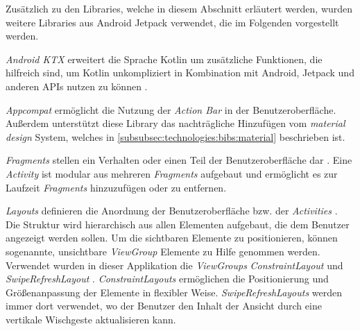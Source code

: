 \documentclass[a4paper]{article}
\begin{document}
Zusätzlich zu den Libraries, welche in diesem Abschnitt erläutert werden, wurden weitere Libraries aus Android Jetpack verwendet, die im Folgenden vorgestellt werden.

\textit{Android KTX} erweitert die Sprache Kotlin um zusätzliche Funktionen, die hilfreich sind, um Kotlin unkompliziert in Kombination mit Android, Jetpack und anderen APIs nutzen zu können \autocite{android_ktx}.

\textit{Appcompat} \autocite{android_appcompat} ermöglicht die Nutzung der \textit{Action Bar} \autocite{android_action_bar} in der Benutzeroberfläche. Außerdem unterstützt diese Library das nachträgliche Hinzufügen vom \textit{material design} System, welches in \autoref{subsubsec:technologies:bibs:material} beschrieben ist.

\textit{Fragments} stellen ein Verhalten oder einen Teil der Benutzeroberfläche dar \autocite{android_fragments}. Eine \textit{Activity} ist modular aus mehreren \textit{Fragments} aufgebaut und ermöglicht es zur Laufzeit \textit{Fragments} hinzuzufügen oder zu entfernen.

\textit{Layouts} definieren die Anordnung der Benutzeroberfläche bzw. der \textit{Activities} \autocite{android_layouts}. Die Struktur wird hierarchisch aus allen Elementen aufgebaut, die dem Benutzer angezeigt werden sollen. Um die sichtbaren Elemente zu positionieren, können sogenannte, unsichtbare \textit{ViewGroup} Elemente zu Hilfe genommen werden. Verwendet wurden in dieser Applikation die \textit{ViewGroups} \textit{ConstraintLayout} \autocite{android_constraintlayout} und \textit{SwipeRefreshLayout} \autocite{android_swiperefreshlayout}. \textit{ConstraintLayouts} ermöglichen die Positionierung und Größenanpassung der Elemente in flexibler Weise. \textit{SwipeRefreshLayouts} werden immer dort verwendet, wo der Benutzer den Inhalt der Ansicht durch eine vertikale Wischgeste aktualisieren kann.
\end{document}
